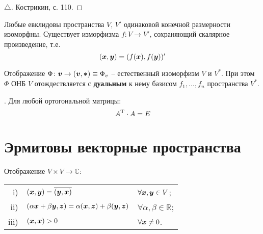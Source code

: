\begin{proof}[$\triangle$]
Кострикин, с. 110.
\end{proof}

\begin{to_thr}
    Любые евклидовы пространства $V$, $V'$ одинаковой конечной размерности изоморфны. Существует изморфизма $f \colon V \to V'$, сохраняющий скалярное произведение, т.е.
    \begin{equation}
        (\mbox{\boldmath $x$}, \mbox{\boldmath $y$}) = (f(\mbox{\boldmath $x$}), f(\mbox{\boldmath $y$}))'
    \end{equation}
\end{to_thr}

\begin{to_thr}
    Отображение $\Phi \colon \mbox{\boldmath $v$} \to (\mbox{\boldmath $v$}, \mbox{\boldmath $*$}) \equiv \Phi_{v}$ -- естественный изоморфизм $V$ и $V^{*}$. При этом $\Phi$ ОНБ $V$ отождествляется с \textbf{дуальным} к нему базисом $f_1, \dots, f_n$ пространства $V^*$. 
\end{to_thr}


\noindent
\socrat. Для любой ортогональной матрицы:
\begin{equation}
    A^{\text{T}} \cdot A = E
\end{equation} 


\section*{Эрмитовы векторные пространства}

\begin{to_def}
    Отображение $V \times V \to \mathbb{C}$:\\
      \begin{tabular}{rll}
        i)& $(\mbox{\boldmath $x$}, \mbox{\boldmath $y$}) = \overline{(\mbox{\boldmath $y$}, \mbox{\boldmath $x$})}$ & $\forall \mbox{\boldmath $x$}, \mbox{\boldmath $y$} \in V$; \\
       ii) & $(\alpha \mbox{\boldmath $x$} + \beta \mbox{\boldmath $y$}, \mbox{\boldmath $z$}) = \alpha (\mbox{\boldmath $x$}, \mbox{\boldmath $z$}) + \beta (\mbox{\boldmath $y$}, \mbox{\boldmath $z$})$ & $\forall \alpha, \beta \in \mathbb{R}$; \\
       iii) & $(\mbox{\boldmath $x$}, \mbox{\boldmath $x$}) > 0$ & $\forall \mbox{\boldmath $x$} \neq 0$. \\
        \end{tabular}
\end{to_def}
